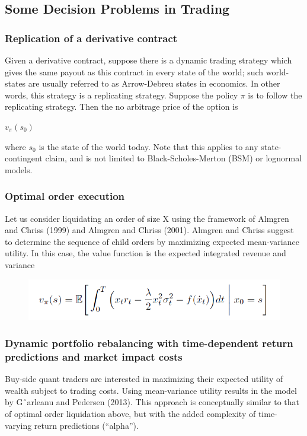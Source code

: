 \documentclass{article}
\begin{document}
\subsection{Some Decision Problems in Trading}
\subsubsection{Replication of a derivative contract}
Given a derivative contract, suppose there is a dynamic trading strategy which gives the same payout as this contract in every state of the world; such world-states are usually referred to as Arrow-Debreu states in economics. In other words,
this strategy is a replicating strategy. Suppose the policy $\pi$ is to follow the replicating strategy. Then the no arbitrage price of the option is\\
\begin{center}
$v_\pi (s_0)$
\end{center}
where $s_0$ is the state of the world today. Note that this applies to any state-contingent claim, and is not limited to Black-Scholes-Merton (BSM) or lognormal models.

\subsubsection{Optimal order execution}
Let us consider liquidating an order of size X using the framework of Almgren and Chriss (1999) and Almgren and Chriss (2001). Almgren and Chriss suggest to determine the sequence of child orders by maximizing expected mean-variance utility. In this case, the value function is the expected integrated revenue and variance

\begin{figure}[H]
\begin{center}
\includegraphics[scale = 0.5]{Ex2.png}
\end{center}
\end{figure}

\subsubsection{Dynamic portfolio rebalancing with time-dependent return predictions and market impact costs}
Buy-side quant traders are interested in maximizing their expected utility of wealth subject to trading costs. Using
mean-variance utility results in the model by Gˆarleanu and Pedersen (2013). This approach is conceptually similar to that of optimal order liquidation above, but with the added complexity of time-varying return predictions (“alpha”).
\end{document}

